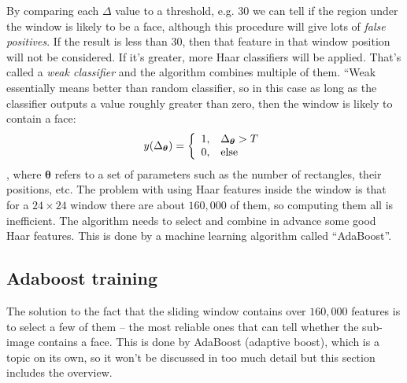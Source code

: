 \documentclass[a4paper]{article}
\begin{document}
By comparing each $\Delta$ value to a threshold, e.g. $30$ we can tell if the region under the window is likely to be a face, although this procedure will give lots of \textit{false positives}. If the result is less than $30$, then that feature in that window position will not be considered. If it's greater, more Haar classifiers will be applied. That's called a \textit{weak classifier} and the algorithm combines multiple of them. ``Weak essentially means better than random classifier, so in this case as long as the classifier outputs a value roughly greater than zero, then the window is likely to contain a face:
\begin{equation}
    y(\Delta_{\boldsymbol{\theta}})= \left\{
\begin{array}{ll}
      1, & \Delta_{\boldsymbol{\theta}} > T\\
      0, & \textup{else} \\
\end{array} 
\right. 
\end{equation}
, where $\boldsymbol{\theta}$ refers to a set of parameters such as the number of rectangles, their positions, etc. The problem with using Haar features inside the window is that for a $24\times 24$ window there are about $160,000$ of them, so computing them all is inefficient. The algorithm needs to select and combine in advance some good Haar features. This is done by a machine learning algorithm called ``AdaBoost''.






\subsection{Adaboost training}
The solution to the fact that the sliding window contains over $160,000$ features is to select a few of them -- the most reliable ones that can tell whether the sub-image contains a face. This is done by AdaBoost (adaptive boost), which is a topic on its own, so it won't be discussed in too much detail but this section includes the overview.
\end{document}
